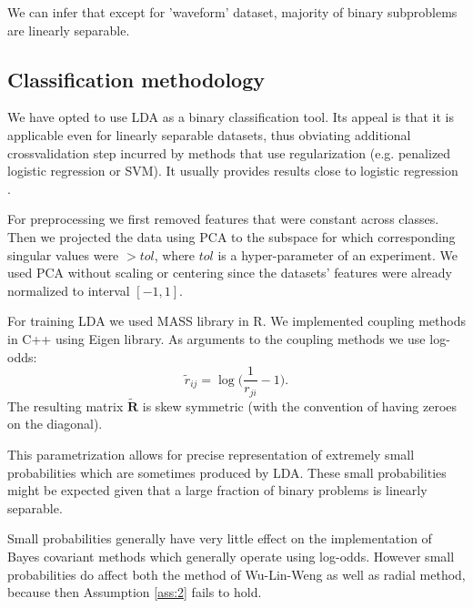 

We can infer that except for 'waveform' dataset, majority of binary subproblems are linearly separable.

\subsection{Classification methodology}

We have opted to use LDA as a binary classification tool. Its appeal is that it is applicable even for linearly separable datasets, thus obviating additional crossvalidation step incurred by methods that use regularization (e.g. penalized logistic regression or SVM). It usually provides results close to logistic regression \cite{james2013introduction}.

For preprocessing we first removed features that were constant across classes. Then we projected the data using PCA to the subspace for which corresponding singular values were $> tol$, where $tol$ is a hyper-parameter of an experiment. We used PCA without scaling or centering since the datasets' features were already normalized to interval $[-1,1]$. 

For training LDA we used MASS library in R. We implemented coupling methods in C++ using Eigen library. As arguments to the coupling methods we use log-odds:
$$
\tilde r_{ij} = \log \biggl(\frac{1}{r_{ji}} - 1\biggr).
$$
The resulting matrix $\tilde{\boldsymbol{R}}$ is skew symmetric (with the convention of having zeroes on the diagonal).

This parametrization allows for precise representation of extremely small probabilities which are sometimes produced by LDA. These small probabilities might be expected given that a large fraction of binary problems is linearly separable. 

Small probabilities generally have very little effect on the implementation of Bayes covariant methods which generally operate using log-odds. However small probabilities do affect both the method of Wu-Lin-Weng as well as radial method, because then Assumption \ref{ass:2} fails to hold. 



